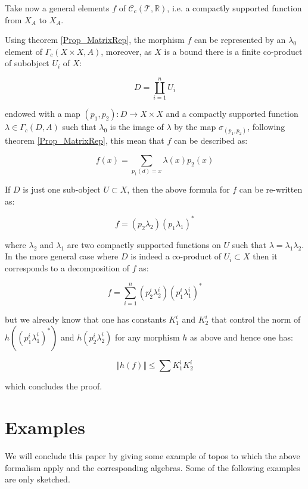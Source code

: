 \documentclass[a4paper]{article}
\newcommand{\R}{\mathbb{R}}
\newcommand{\Tcal}{\mathcal{T}}
\newcommand{\Ccal}{\mathcal{C}}
\newcommand{\blockn}[1]{\par #1 \bigskip}
\begin{document}
{{Take now a general elements $f$ of $\Ccal_c(\Tcal,\R)$, i.e. a compactly supported function from $X_A$ to $X_A$.

Using theorem \ref{Prop_MatrixRep}, the morphism $f$ can be represented by an $\lambda_0$ element of $\Gamma_c(X \times X,A)$, moreover, as $X$ is a bound there is a finite co-product of subobject $U_i$ of $X$:

 \[ D=\coprod_{i=1}^n U_i \]

endowed with a map $(p_1,p_2) : D \rightarrow X \times X$ and a compactly supported function $\lambda \in \Gamma_c(D,A)$ such that $\lambda_0$ is the image of $\lambda$ by the map $\sigma_{(p_1,p_2)}$, following theorem \ref{Prop_MatrixRep}, this mean that $f$ can be described as:

\[ f(x) = \sum_{p_1(d)=x} \lambda(x) p_2(x) \]

If $D$ is just one sub-object $U \subset X$, then the above formula for $f$ can be re-written as:

\[ f =  (p_2 \lambda_2) (p_1 \lambda_1)^* \]

where $\lambda_2$ and $\lambda_1$ are two compactly supported functions on $U$ such that $\lambda= \lambda_1 \lambda_2$.
In the more general case where $D$ is indeed a co-product of $U_i \subset X$ then it corresponds to a decomposition of $f$ as:

\[ f = \sum_{i=1}^n (p^i_2 \lambda^i_2) (p^i_1 \lambda^i_1)^* \]

but we already know that one has constants $K^i_1$ and $K^i_2$ that control the norm of $h((p^i_1 \lambda^i_1)^*)$ and $h(p^i_2 \lambda^i_2)$ for any morphism $h$ as above and hence one has:

\[ \Vert h(f) \Vert \leqslant \sum K^i_1 K^i_2 \]

which concludes the proof.

}

}

\section{Examples}
\label{Sec_examples}

\blockn{We will conclude this paper by giving some example of topos to which the above formalism apply and the corresponding algebras. Some of the following examples are only sketched.}
\end{document}
